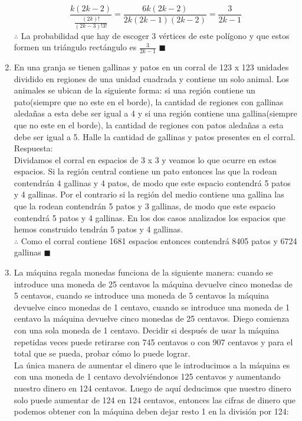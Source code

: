 \documentclass{book}
\begin{document}
\begin{enumerate}
        $$\frac{k(2k-2)}{\frac{(2k)!}{(2k-3)!3!}}=\frac{6k(2k-2)}{2k(2k-1)(2k-2)}=\frac{3}{2k-1}$$
        $\therefore$ La probabilidad que hay de escoger 3 vértices de este polígono y que estos formen un triángulo rectángulo es $\displaystyle{\frac{3}{2k-1}}$ $\blacksquare$\\
        \item En una granja se tienen gallinas y patos en un corral de 123 x 123 unidades dividido en regiones de una unidad cuadrada y contiene un solo animal. Los animales se ubican de la siguiente forma: si una región contiene un pato(siempre que no este en el borde), la cantidad de regiones con gallinas aledañas a esta debe ser igual a 4 y si una región contiene una gallina(siempre que no este en el borde), la cantidad de regiones con patos aledañas a esta debe ser igual a 5. Halle la cantidad de gallinas y patos presentes en el corral.\\
        Respuesta:\\
        Dividamos el corral en espacios de 3 x 3 y veamos lo que ocurre en estos espacios. Si la región central contiene un pato entonces las que la rodean contendrán 4 gallinas y 4 patos, de modo que este espacio contendrá 5 patos y 4 gallinas. Por el contrario si la región del medio contiene una gallina las que la rodean contendrán 5 patos y 3 gallinas, de modo que este espacio contendrá 5 patos y 4 gallinas. En los dos casos analizados los espacios que hemos construido tendrán 5 patos y 4 gallinas. \\$\therefore$ Como el corral contiene 1681 espacios entonces contendrá 8405 patos y 6724 gallinas $\blacksquare$ \\
        \item La máquina regala monedas funciona de la siguiente manera: cuando se introduce una moneda de 25 centavos la máquina devuelve cinco monedas de 5 centavos, cuando se introduce una moneda de 5 centavos la máquina devuelve cinco monedas de 1 centavo, cuando se introduce una moneda de 1 centavo la máquina devuelve cinco monedas de 25 centavos. Diego comienza con una sola moneda de 1 centavo. Decidir si después de usar la máquina repetidas veces puede retirarse con 745 centavos o con 907 centavos y para el total que se pueda, probar cómo lo puede lograr.\\
        La única manera de aumentar el dinero que le introducimos a la máquina es con una moneda de 1 centavo devolviéndonos 125 centavos y aumentando nuestro dinero en 124 centavos. Luego de aquí deducimos que nuestro dinero solo puede aumentar de 124 en 124 centavos, entonces las cifras de dinero que podemos obtener con la máquina deben dejar resto 1 en la división por 124:

\end{enumerate}
\end{document}
